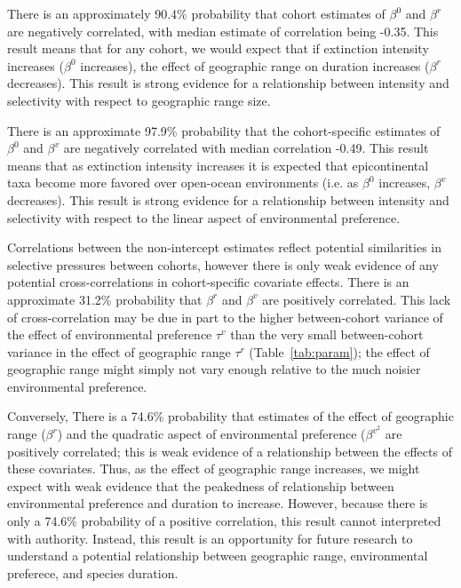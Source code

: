 \documentclass[11pt]{article}
\begin{document}
There is an approximately 90.4\% probability that cohort estimates of \(\beta^{0}\) and \(\beta^{r}\) are negatively correlated, with median estimate of correlation being -0.35. This result means that for any cohort, we would expect that if extinction intensity increases (\(\beta^{0}\) increases), the effect of geographic range on duration increases (\(\beta^{r}\) decreases). This result is strong evidence for a relationship between intensity and selectivity with respect to geographic range size.

There is an approximate 97.9\% probability that the cohort-specific estimates of \(\beta^{0}\) and \(\beta^{v}\) are negatively correlated with median correlation -0.49. This result means that as extinction intensity increases it is expected that epicontinental taxa become more favored over open-ocean environments (i.e. as \(\beta^{0}\) increases, \(\beta^{v}\) decreases). This result is strong evidence for a relationship between intensity and selectivity with respect to the linear aspect of environmental preference. 

Correlations between the non-intercept estimates reflect potential similarities in selective pressures between cohorts, however there is only weak evidence of any potential cross-correlations in cohort-specific covariate effects. There is an approximate 31.2\% probability that \(\beta^{r}\) and \(\beta^{v}\) are positively correlated. This lack of cross-correlation may be due in part to the higher between-cohort variance of the effect of environmental preference \(\tau^{v}\) than the very small between-cohort variance in the effect of geographic range \(\tau^{r}\) (Table~\ref{tab:param}); the effect of geographic range might simply not vary enough relative to the much noisier environmental preference. 

Conversely, There is a 74.6\% probability that estimates of the effect of geographic range (\(\beta^{r}\)) and the quadratic aspect of environmental preference (\(\beta^{v^{2}}\) are positively correlated; this is weak evidence of a relationship between the effects of these covariates. Thus, as the effect of geographic range increases, we might expect with weak evidence that the peakedness of relationship between environmental preference and duration to increase. However, because there is only a 74.6\% probability of a positive correlation, this result cannot interpreted with authority. Instead, this result is an opportunity for future research to understand a potential relationship between geographic range, environmental preferece, and species duration.
\end{document}
